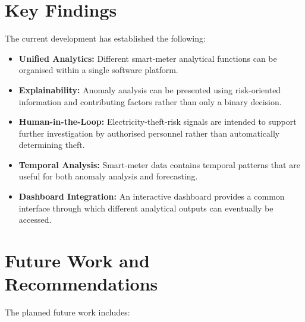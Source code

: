 \documentclass{tietreport}
\begin{document}
\section{Key Findings}

The current development has established the following:

\begin{itemize}

    \item \textbf{Unified Analytics:}
    Different smart-meter analytical functions can be organised within a
    single software platform.

    \item \textbf{Explainability:}
    Anomaly analysis can be presented using risk-oriented information and
    contributing factors rather than only a binary decision.

    \item \textbf{Human-in-the-Loop:}
    Electricity-theft-risk signals are intended to support further
    investigation by authorised personnel rather than automatically
    determining theft.

    \item \textbf{Temporal Analysis:}
    Smart-meter data contains temporal patterns that are useful for both
    anomaly analysis and forecasting.

    \item \textbf{Dashboard Integration:}
    An interactive dashboard provides a common interface through which
    different analytical outputs can eventually be accessed.

\end{itemize}

\section{Future Work and Recommendations}

The planned future work includes:
\end{document}
